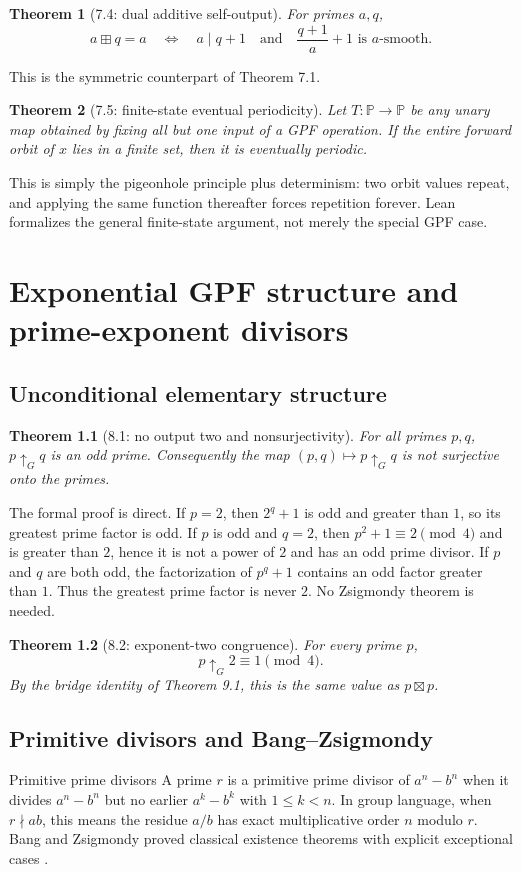 \documentclass[11pt,a4paper,oneside,open=any,headings=small]{scrbook}
\newtheorem{theorem}{Theorem}[chapter]
\theoremstyle{definition}
\newcommand{\Pset}{\mathbb{P}}
\newcommand{\gexp}{\mathbin{\uparrow_{G}}}
\begin{document}
\begin{theorem}[7.4: dual additive self-output]
For primes $a,q$,
\[
a\boxplus q=a
\quad\Longleftrightarrow\quad
a\mid q+1\quad\text{and}\quad
\frac{q+1}{a}+1\text{ is $a$-smooth}.
\]
\end{theorem}
This is the symmetric counterpart of Theorem 7.1.

\begin{theorem}[7.5: finite-state eventual periodicity]
Let $T:\Pset\to\Pset$ be any unary map obtained by fixing all but one input of a GPF operation. If the entire forward orbit of $x$ lies in a finite set, then it is eventually periodic.
\end{theorem}
This is simply the pigeonhole principle plus determinism: two orbit values repeat, and applying the same function thereafter forces repetition forever. Lean formalizes the general finite-state argument, not merely the special GPF case.

\chapter{Exponential GPF structure and prime-exponent divisors}\label{ch:exp}

\section{Unconditional elementary structure}
\begin{theorem}[8.1: no output two and nonsurjectivity]
For all primes $p,q$, $p\gexp q$ is an odd prime. Consequently the map $(p,q)\mapsto p\gexp q$ is not surjective onto the primes.
\end{theorem}
The formal proof is direct. If $p=2$, then $2^q+1$ is odd and greater than $1$, so its greatest prime factor is odd. If $p$ is odd and $q=2$, then $p^2+1\equiv2\pmod4$ and is greater than $2$, hence it is not a power of $2$ and has an odd prime divisor. If $p$ and $q$ are both odd, the factorization of $p^q+1$ contains an odd factor greater than $1$. Thus the greatest prime factor is never $2$. No Zsigmondy theorem is needed.

\begin{theorem}[8.2: exponent-two congruence]
For every prime $p$,
\[
p\gexp2\equiv1\pmod4.
\]
By the bridge identity of Theorem 9.1, this is the same value as $p\boxtimes p$.
\end{theorem}

\section{Primitive divisors and Bang--Zsigmondy}
\begin{conceptbox}{Primitive prime divisors}
A prime $r$ is a primitive prime divisor of $a^n-b^n$ when it divides $a^n-b^n$ but no earlier $a^k-b^k$ with $1\le k<n$. In group language, when $r\nmid ab$, this means the residue $a/b$ has exact multiplicative order $n$ modulo $r$. Bang and Zsigmondy proved classical existence theorems with explicit exceptional cases \parencite{Bang1886,Zsigmondy1892}.
\end{conceptbox}
\end{document}
